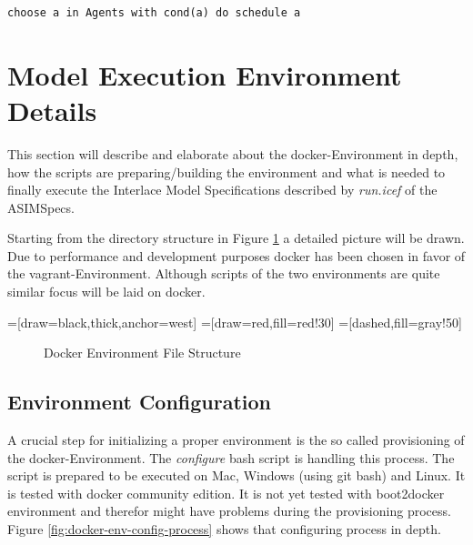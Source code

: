 \begin{lstlisting}[language=bsl]
	choose a in Agents with cond(a) do schedule a
\end{lstlisting}


\section{Model Execution Environment Details}
\label{sec:exec-env-model-details}

This section will describe and elaborate about the docker-Environment in depth, how the scripts are preparing/building the environment and what is needed to finally execute the Interlace Model Specifications described by \textit{run.icef} of the ASIMSpecs.

Starting from the directory structure in Figure \ref{fig:docker-env-file-struct} a detailed picture will be drawn. Due to performance and  development purposes docker has been chosen in favor of the vagrant-Environment. Although scripts of the two environments are quite similar focus will be laid on docker.

=[draw=black,thick,anchor=west]
=[draw=red,fill=red!30]
=[dashed,fill=gray!50]
\begin{figure}[htbp]
\centering
{}
\caption{Docker Environment File Structure}
\label{fig:docker-env-file-struct}
\end{figure}

\subsection{Environment Configuration}

A crucial step for initializing a proper environment is the so called provisioning of the docker-Environment. The \textit{configure} bash script is handling this process. The script is prepared to be executed on Mac, Windows (using git bash) and Linux. It is tested with docker community edition. It is not yet tested with boot2docker environment and therefor might have problems during the provisioning process. Figure \ref{fig:docker-env-config-process} shows that configuring process in depth.

